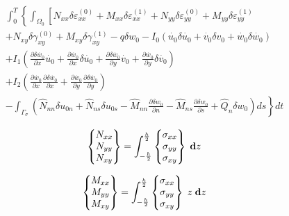 \documentclass[11pt,letterpaper,titlepage,draft]{article}
\newcommand{\diff}{\textbf d}
\newcommand{\PDer}[2]{\frac{\partial #1}{\partial #2}}
\numberwithin{equation}{subsection}
\begin{document}
\begin{multline}\label{E:S1001:SS102:7}
         \int_0^T\left\{\int_{\Omega_0} \left[ N_{xx} \delta \varepsilon_{xx}^{(0)} + M_{xx} \delta \varepsilon_{xx}^{(1)} + N_{yy} \delta \varepsilon_{yy}^{(0)} + M_{yy} \delta \varepsilon_{yy}^{(1)} \right.\right.\\
                                               + N_{xy} \delta \gamma_{xy}^{(0)} + M_{xy} \delta \gamma_{xy}^{(1)} - q\delta w_0 - I_0\left(\dot{u_0}\delta\dot{u_0} + \dot{v_0}\delta{v_0} + \dot{w_0}\delta\dot{w_0}\right) \\
                                               + I_1\left(\PDer{\delta \dot{w_0}}{x}\dot{u_0} + \PDer{\dot{w_0}}{x}\delta \dot{u_0} +   \PDer{\delta \dot{w_0}}{y}\dot{v_0} +  \PDer{\dot{w_0}}{y}\delta \dot{v_0} \right) \\
                                               + I_2\left(\PDer{\dot{w_0}}{x} \PDer{\delta \dot{w_0}}{x} +\PDer{\dot{w_0}}{y} \PDer{\delta \dot{w_0}}{y} \right) \\
             - \left. \int_{\Gamma_{\sigma}} \left( \hat{N}_{nn}\delta u_{0n} + \hat{N}_{ns}\delta u_{0s} - \hat{M}_{nn}\PDer{\delta w_0}{n} - \hat{M}_{ns}\PDer{\delta w_0}{s} + \hat{Q}_n \delta w_0 \right) ds \right\} dt
\end{multline}

\begin{equation}\label{E:S1001:SS102:8}
\begin{Bmatrix}
N_{xx}\\
N_{yy}\\
N_{xy}
\end{Bmatrix}
 = 
\int_{-\frac{h}{2}}^{\frac{h}{2}}
\begin{Bmatrix}
\sigma_{xx}\\
\sigma_{yy}\\
\sigma_{xy}
\end{Bmatrix}
\; \diff{z}
\end{equation}

\begin{equation}\label{E:S1001:SS102:9}
\begin{Bmatrix}
M_{xx}\\
M_{yy}\\
M_{xy}
\end{Bmatrix}
 = 
\int_{-\frac{h}{2}}^{\frac{h}{2}}
\begin{Bmatrix}
\sigma_{xx}\\
\sigma_{yy}\\
\sigma_{xy}
\end{Bmatrix}
\; z\;  \diff{z}
\end{equation}
\end{document}
